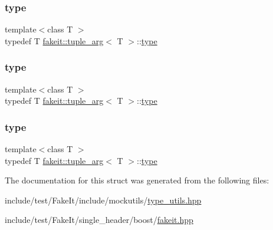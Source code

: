\subsubsection{\texorpdfstring{type}{type}\hspace{0.1cm}{\footnotesize\ttfamily [7/9]}}
{\footnotesize\ttfamily template$<$class T $>$ \\
typedef T \mbox{\hyperlink{structfakeit_1_1tuple__arg}{fakeit\+::tuple\+\_\+arg}}$<$ T $>$\+::\mbox{\hyperlink{structfakeit_1_1tuple__arg_abaa55c1c51c4f37325b54def32256f1d}{type}}}

\mbox{\label{structfakeit_1_1tuple__arg_abaa55c1c51c4f37325b54def32256f1d}} 
\subsubsection{\texorpdfstring{type}{type}\hspace{0.1cm}{\footnotesize\ttfamily [8/9]}}
{\footnotesize\ttfamily template$<$class T $>$ \\
typedef T \mbox{\hyperlink{structfakeit_1_1tuple__arg}{fakeit\+::tuple\+\_\+arg}}$<$ T $>$\+::\mbox{\hyperlink{structfakeit_1_1tuple__arg_abaa55c1c51c4f37325b54def32256f1d}{type}}}

\mbox{\label{structfakeit_1_1tuple__arg_abaa55c1c51c4f37325b54def32256f1d}} 
\subsubsection{\texorpdfstring{type}{type}\hspace{0.1cm}{\footnotesize\ttfamily [9/9]}}
{\footnotesize\ttfamily template$<$class T $>$ \\
typedef T \mbox{\hyperlink{structfakeit_1_1tuple__arg}{fakeit\+::tuple\+\_\+arg}}$<$ T $>$\+::\mbox{\hyperlink{structfakeit_1_1tuple__arg_abaa55c1c51c4f37325b54def32256f1d}{type}}}



The documentation for this struct was generated from the following files\+:\begin{DoxyCompactItemize}
\item 
include/test/\+Fake\+It/include/mockutils/\mbox{\hyperlink{type__utils_8hpp}{type\+\_\+utils.\+hpp}}\item 
include/test/\+Fake\+It/single\+\_\+header/boost/\mbox{\hyperlink{single__header_2boost_2fakeit_8hpp}{fakeit.\+hpp}}\end{DoxyCompactItemize}
